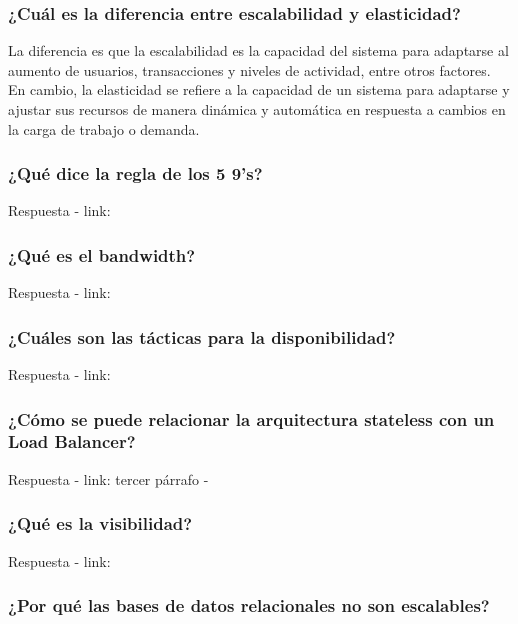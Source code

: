 \documentclass{article}
\begin{document}
    \subsubsection{¿Cuál es la diferencia entre escalabilidad y elasticidad?}

    La diferencia es que la escalabilidad es la capacidad del sistema para adaptarse al aumento de usuarios, transacciones y niveles de actividad, entre otros factores. 
    En cambio, la elasticidad se refiere a la capacidad de un sistema para adaptarse y ajustar sus recursos de manera dinámica y automática en respuesta a cambios en la carga de trabajo o demanda.


    \subsubsection{¿Qué dice la regla de los 5 9's?}

    Respuesta - link: \textbf{~}


    \subsubsection{¿Qué es el bandwidth?}

    Respuesta - link: \textbf{~} 

    
    \subsubsection{¿Cuáles son las tácticas para la disponibilidad?}
    
    Respuesta - link: \textbf{~}

    \subsubsection{¿Cómo se puede relacionar la arquitectura \textbf{stateless} con un \textbf{Load Balancer}?}
    
    Respuesta - link: tercer párrafo - \textbf{~}

    \subsubsection{¿Qué es la visibilidad?}
    Respuesta - link: \textbf{~}
    
    \subsubsection{¿Por qué las bases de datos relacionales no son escalables?}
\end{document}
